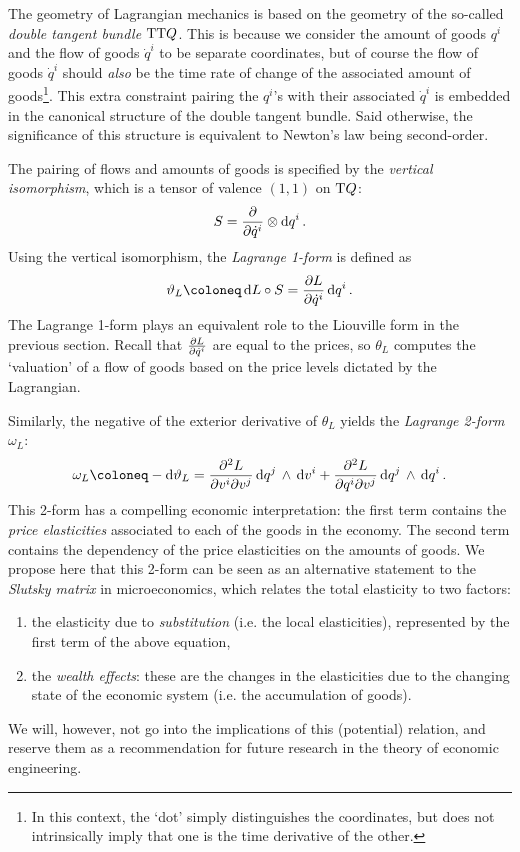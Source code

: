 The geometry of Lagrangian mechanics is based on the geometry of the so-called \emph{double tangent bundle} $\mathrm{T}\mathrm{T}Q$. This is because we consider the amount of goods $q^i$ and the flow of goods $\dot{q}^i$ to be separate coordinates, but of course the flow of goods $\dot{q}^i$ should \emph{also} be the time rate of change of the associated amount of goods\footnote{In this context, the `dot' simply distinguishes the coordinates, but does not intrinsically imply that one is the time derivative of the other.}. This extra constraint pairing the $q^i$'s with their associated $\dot{q}^i$ is embedded in the canonical structure of the double tangent bundle. Said otherwise, the significance of this structure is equivalent to Newton's law being second-order.

The pairing of flows and amounts of goods is specified by the \emph{vertical isomorphism}, which is a tensor of valence $(1,1)$ on $\mathrm{T}Q$: \cite{Carinena1990}
\begin{equation}
    S = \pdv{}{\dot{q}^i}\otimes \dd{q^i}.
\end{equation}
Using the vertical isomorphism, the \emph{Lagrange 1-form} is defined as
\begin{equation}
    \theta_L \coloneq \dd{L}\circ S = \pdv{L}{\dot{q}^i}\dd{q^i}.
\end{equation}
The Lagrange 1-form plays an equivalent role to the Liouville form in the previous section. Recall that $\pdv{L}{\dot{q}^i}$ are equal to the prices, so $\theta_L$ computes the `valuation' of a flow of goods based on the price levels dictated by the Lagrangian. 

Similarly, the negative of the exterior derivative of $\theta_L$ yields the \emph{Lagrange 2-form} $\omega_L$:
\begin{equation}
    \omega_L \coloneq -\dd{\theta_L} = \pdv[2]{L}{v^i}{v^j}\wedgep{\dd{q^j}}{\dd{v^i}} + \pdv[2]{L}{q^i}{v^j}\wedgep{\dd{q^j}}{\dd{q^i}}.
\end{equation}
This 2-form has a compelling economic interpretation: the first term contains the \emph{price elasticities} associated to each of the goods in the economy. The second term contains the dependency of the price elasticities on the amounts of goods.
We propose here that this 2-form can be seen as an alternative statement to the \emph{Slutsky matrix} in microeconomics, which relates the total elasticity to two factors: \cite{varianhalr1992}
\begin{enumerate}[label=(\roman*), noitemsep]
    \item the elasticity due to \emph{substitution} (i.e. the local elasticities), represented by the first term of the above equation, 
    \item the \emph{wealth effects}: these are the changes in the elasticities due to the changing state of the economic system (i.e. the accumulation of goods).
\end{enumerate}
We will, however, not go into the implications of this (potential) relation, and reserve them as a recommendation for future research in the theory of economic engineering.

